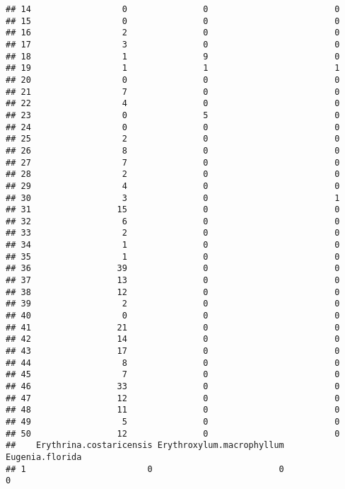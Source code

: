 \documentclass[
]{article}
\begin{document}
\begin{verbatim}
## 14                  0               0                         0
## 15                  0               0                         0
## 16                  2               0                         0
## 17                  3               0                         0
## 18                  1               9                         0
## 19                  1               1                         1
## 20                  0               0                         0
## 21                  7               0                         0
## 22                  4               0                         0
## 23                  0               5                         0
## 24                  0               0                         0
## 25                  2               0                         0
## 26                  8               0                         0
## 27                  7               0                         0
## 28                  2               0                         0
## 29                  4               0                         0
## 30                  3               0                         1
## 31                 15               0                         0
## 32                  6               0                         0
## 33                  2               0                         0
## 34                  1               0                         0
## 35                  1               0                         0
## 36                 39               0                         0
## 37                 13               0                         0
## 38                 12               0                         0
## 39                  2               0                         0
## 40                  0               0                         0
## 41                 21               0                         0
## 42                 14               0                         0
## 43                 17               0                         0
## 44                  8               0                         0
## 45                  7               0                         0
## 46                 33               0                         0
## 47                 12               0                         0
## 48                 11               0                         0
## 49                  5               0                         0
## 50                 12               0                         0
##    Erythrina.costaricensis Erythroxylum.macrophyllum Eugenia.florida
## 1                        0                         0               0

\end{verbatim}
\end{document}
